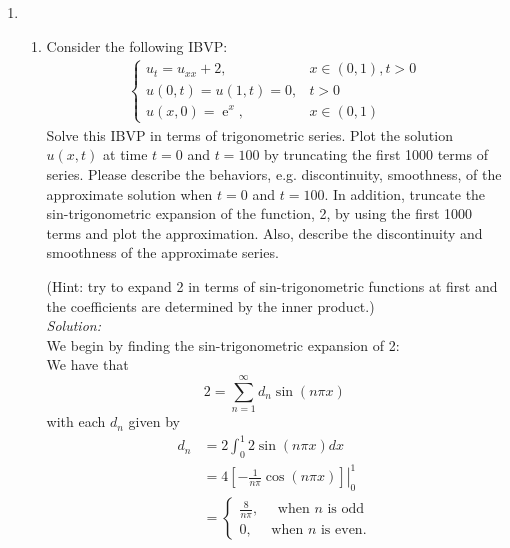 \documentclass[10pt]{amsart}
\DeclareMathOperator{\E}{e}
\theoremstyle{nonumberplain}
\begin{document}
\begin{enumerate}[label={\bf {\arabic*}:}]
\item
\begin{enumerate}
\item Consider the following IBVP:
\begin{align*}
\begin{cases}
u_t = u_{xx} + 2, &x \in (0, 1), t > 0 \\
u(0, t) = u(1, t) = 0, & t > 0 \\
u(x, 0) = \E^{x}, &x \in (0, 1)
\end{cases}
\end{align*}
Solve this IBVP in terms of trigonometric series.
Plot the solution $u(x, t)$ at time $t=0$ and $t=100$ by truncating the first 1000 terms of series.
Please describe the behaviors, e.g. discontinuity, smoothness, of the approximate solution when $t=0$ and $t=100$.
In addition, truncate the sin-trigonometric expansion of the function, 2,  by using the first 1000 terms and plot the approximation.
Also, describe the discontinuity and smoothness of the approximate series.

(Hint: try to expand 2 in terms of sin-trigonometric functions at first and the coefficients are determined by the inner product.) \\

\noindent
\textit{Solution:} \\
We begin by finding the sin-trigonometric expansion of 2: \\

\noindent
We have that
$$
2 = \sum_{n=1}^{\infty}d_n \sin(n\pi x)
$$
with each $d_n$ given by
\begin{align*}
d_n &= 2 \int_0^1 2 \sin(n \pi x) dx \\
	&= 4 \left. \left[ -\frac 1 {n \pi} \cos(n \pi x) \right] \right|_0^1 \\
	&= \begin{cases}
	\frac 8 {n \pi}, \quad \text{ when $n$ is odd} \\
	0, \quad \text{ when $n$ is even}.
	\end{cases}
\end{align*}


\end{enumerate}
\end{enumerate}
\end{document}
